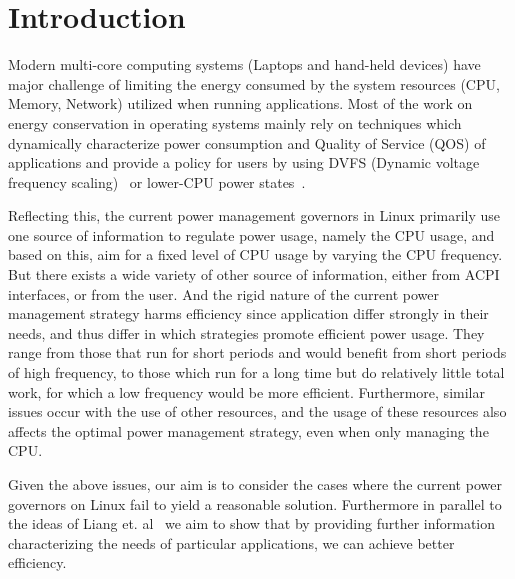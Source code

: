 \section{Introduction}\label{sec:intro}\label{sec:motiv}

Modern multi-core computing systems (Laptops and hand-held devices) have major challenge of limiting the energy consumed by the system resources (CPU, Memory, Network) utilized when running applications. Most of the work on energy conservation in operating systems mainly rely on techniques which dynamically characterize power consumption and Quality of Service (QOS) of applications and provide a policy for users by using DVFS (Dynamic voltage frequency scaling)~\cite{dvfs} or lower-CPU power states~\cite{sleepscale, ecos}.

Reflecting this, the current power management governors in Linux primarily use one source of information to regulate power usage, namely the CPU usage, and based on this, aim for a fixed level of CPU usage by varying the CPU frequency. But there exists a wide variety of other source of information, either from ACPI~\cite{acpi, freqgov} interfaces, or from the user. And the rigid nature of the current power management strategy harms efficiency since application differ strongly in their needs, and thus differ in which strategies promote efficient power usage. They range from those that run for short periods and would benefit from short periods of high frequency, to those which run for a long time but do relatively little total work, for which a low frequency would be more efficient. Furthermore, similar issues occur with the use of other resources, and the usage of these resources also affects the optimal power management strategy, even when only managing the CPU.

Given the above issues, our aim is to consider the cases where the current power governors on Linux fail to yield a reasonable solution. Furthermore in parallel to the ideas of Liang et. al~\cite{and-dvfs} we aim to show that by providing further information characterizing the needs of particular applications, we can achieve better efficiency.

